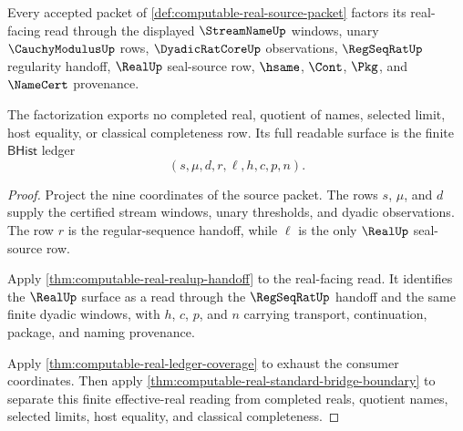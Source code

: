 \begin{theorem}
\label{thm:computable-real-regseqrat-seal-factorization}
Every accepted packet of
\autoref{def:computable-real-source-packet} factors its real-facing read
through the displayed $\StreamNameUp$ windows, unary $\CauchyModulusUp$ rows,
$\DyadicRatCoreUp$ observations, $\RegSeqRatUp$ regularity handoff,
$\RealUp$ seal-source row, $\hsame$, $\Cont$, $\Pkg$, and $\NameCert$
provenance.

The factorization exports no completed real, quotient of names, selected
limit, host equality, or classical completeness row. Its full readable
surface is the finite $\mathsf{BHist}$ ledger
$$
(s,\mu,d,r,\ell,h,c,p,n).
$$
\end{theorem}
\begin{proof}
Project the nine coordinates of the source packet. The rows $s$, $\mu$, and
$d$ supply the certified stream windows, unary thresholds, and dyadic
observations. The row $r$ is the regular-sequence handoff, while $\ell$ is the
only $\RealUp$ seal-source row.

Apply \autoref{thm:computable-real-realup-handoff} to the real-facing read.
It identifies the $\RealUp$ surface as a read through the $\RegSeqRatUp$
handoff and the same finite dyadic windows, with $h$, $c$, $p$, and $n$
carrying transport, continuation, package, and naming provenance.

Apply \autoref{thm:computable-real-ledger-coverage} to exhaust the consumer
coordinates. Then apply
\autoref{thm:computable-real-standard-bridge-boundary} to separate this
finite effective-real reading from completed reals, quotient names, selected
limits, host equality, and classical completeness.
\end{proof}

